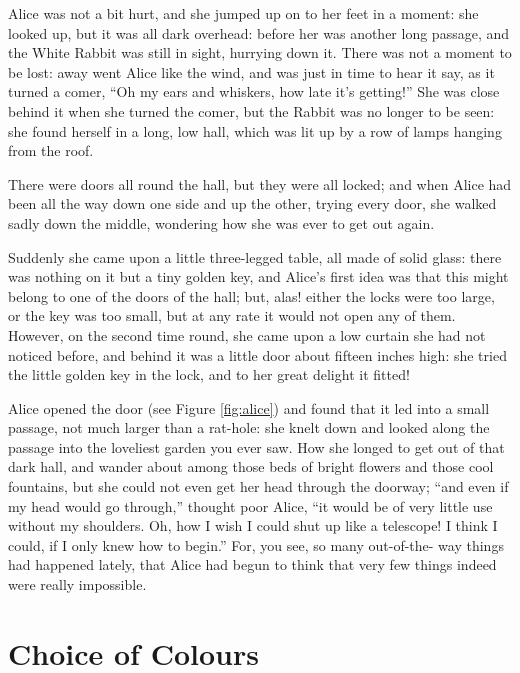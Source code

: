 \documentclass{l3proj}
\begin{document}
Alice was not a bit hurt, and she jumped up on to her feet in a moment: she
looked up, but it was all dark overhead: before her was another long
passage, and the White Rabbit was still in sight, hurrying down it. There
was not a moment to be lost: away went Alice like the wind, and was just in
time to hear it say, as it turned a comer, ``Oh my ears and whiskers, how
late it's getting!'' She was close behind it when she turned the comer, but
the Rabbit was no longer to be seen: she found herself in a long, low hall,
which was lit up by a row of lamps hanging from the roof.

There were doors all round the hall, but they were all locked; and when
Alice had been all the way down one side and up the other, trying every
door, she walked sadly down the middle, wondering how she was ever to get
out again.

Suddenly she came upon a little three-legged table, all made of solid
glass: there was nothing on it but a tiny golden key, and Alice's first
idea was that this might belong to one of the doors of the hall; but, alas!
either the locks were too large, or the key was too small, but at any rate
it would not open any of them. However, on the second time round, she came
upon a low curtain she had not noticed before, and behind it was a little
door about fifteen inches high: she tried the little golden key in the
lock, and to her great delight it fitted!



Alice opened the door (see Figure \ref{fig:alice}) and found that it
led into a small passage, not much larger than a rat-hole: she knelt
down and looked along the passage into the loveliest garden you ever
saw. How she longed to get out of that dark hall, and wander about
among those beds of bright flowers and those cool fountains, but she
could not even get her head through the doorway; ``and even if my head
would go through,'' thought poor Alice, ``it would be of very little
use without my shoulders. Oh, how I wish I could shut up like a
telescope! I think I could, if I only knew how to begin.'' For, you
see, so many out-of-the- way things had happened lately, that Alice
had begun to think that very few things indeed were really impossible.


\section{Choice of Colours}
\label{design}
\end{document}
